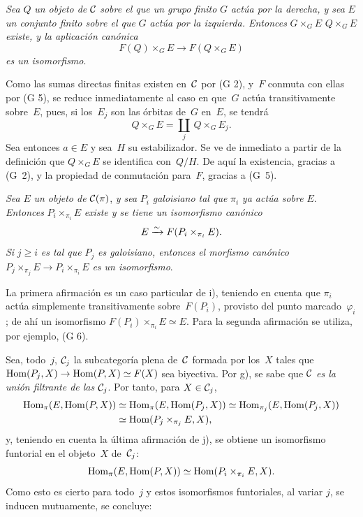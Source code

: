 \begin{enumerateb}
\item[i)] \emph{Sea} $Q$ \emph{un objeto de} $\cal{C}$ \emph{sobre el que
un grupo finito} $G$ \emph{actúa por la derecha, y sea} $E$ \emph{un conjunto
finito sobre el que} $G$ \emph{actúa por la izquierda. Entonces}
{$G\times_GE$}
{$Q\times_GE$}
\emph{existe, y la aplicación canónica}
$$
F(Q)\times_GE\to F(Q\times_GE)
$$
\emph{es un isomorfismo}.

Como las sumas directas finitas existen en~$\cal{C}$ por (G 2), y~$F$ conmuta
con ellas por (G 5), se reduce inmediatamente al caso en que~$G$ actúa
transitivamente sobre~$E$, pues, si los~$E_j$ son las órbitas de~$G$ en~$E$,
se tendrá
$$
Q\times_GE=\underset{j}{\amalg}\,Q\times_GE_j.
$$
Sea entonces $a\in E$ y sea~$H$ su estabilizador. Se ve de inmediato a partir
de la definición que $Q\times_GE$ se identifica con~$Q/H$. De aquí la
existencia, gracias a (G~2), y la propiedad de conmutación para~$F$, gracias
a (G~5).

\item[j)] \emph{Sea} $E$ \emph{un objeto de} $\cal{C}(\pi)$, \emph{y sea}
$P_i$ \emph{galoisiano tal que} $\pi_i$ \emph{ya actúa sobre} $E$.
\emph{Entonces} $P_i\times_{\pi_i}E$ \emph{existe y se tiene un isomorfismo
canónico}
$$
E\isomto F(P_i\times_{\pi_i}E).
$$
\emph{Si} $j\geq i$ \emph{es tal que} $P_j$ \emph{es galoisiano, entonces
el morfismo canónico} $P_j\times_{\pi_j}E\to\allowbreak
P_i\times_{\pi_i}E$ \emph{es un isomorfismo}.

La primera afirmación es un caso particular de i), teniendo en cuenta que
$\pi_i$ actúa simplemente transitivamente sobre~$F(P_i)$, provisto del punto
marcado~$\varphi_i$; de ahí un isomorfismo
$F(P_i)\times_{\pi_i}E\simeq E$. Para la segunda afirmación se utiliza, por
ejemplo, (G 6).

Sea,  todo~$j$, $\cal{C}_j$ la
subcategoría plena de~$\cal{C}$ formada por los~$X$ tales que
$\Hom(P_j,X)\to\Hom(P,X)\simeq F(X)$ sea biyectiva. Por g), se sabe que
$\cal{C}$ \emph{es la unión filtrante de las} $\cal{C}_j$. Por tanto, para
$X\in\cal{C}_j$,
\begin{align*}
\Hom_{\pi}(E,\Hom(P,X))&\simeq\Hom_{\pi}(E,\Hom(P_j,X))
\simeq\Hom_{\pi_j}(E,\Hom(P_j,X))\\
&\simeq\Hom(P_j\times_{\pi_j}E,X),
\end{align*}
y,
teniendo en cuenta la última afirmación de j), se obtiene un isomorfismo
funtorial en el objeto~$X$ de~$\cal{C}_j$:
$$
\Hom_{\pi}(E,\Hom(P,X))\simeq\Hom(P_i\times_{\pi_i}E,X).
$$
Como esto es cierto para todo~$j$ y estos isomorfismos funtoriales, al variar
$j$, se inducen mutuamente, se concluye:


\end{enumerateb}
